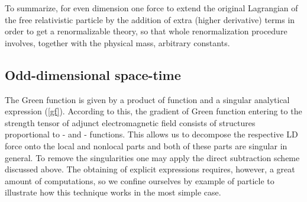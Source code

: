 \documentclass[a4paper,12pt]{article}
\begin{document}
To summarize, for even dimension \coordHE{} one force to extend the original
Lagrangian of the free relativistic particle by the addition of \coordHE{}
extra (higher derivative) terms in order to get a renormalizable theory, so
that whole renormalization procedure involves, together with the physical
mass, \coordHE{} arbitrary constants.

\subsection{ Odd-dimensional space-time}

The Green function is given by a product of \myHighlight{$\theta -$}\coordHE{} function and a
singular analytical expression (\ref{gf}). According to this, the gradient
of Green function entering to the strength tensor \coordHE{} of adjunct
electromagnetic field consists of structures proportional to \myHighlight{$\theta $}\coordHE{} - and
\myHighlight{$\delta $}\coordHE{} - functions. This allows us to decompose the respective LD force
onto the local and nonlocal parts and both of these parts are singular in
general. To remove the singularities one may apply the direct subtraction
scheme discussed above. The obtaining of explicit expressions requires,
however, a great amount of computations, so we confine ourselves by example
of \coordHE{} particle to illustrate how this technique works in the most simple
case.
\end{document}
